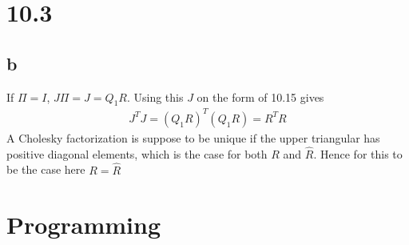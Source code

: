 \documentclass[11pt]{article} %
\begin{document}
\section*{10.3}
\subsection*{\textbf{b}}
If $\Pi = I$, $J \Pi = J = Q_1 R$. Using this $J$ on the form of 10.15 gives
\begin{gather*}J^T J = (Q_ 1 R)^T (Q_1 R) = R^T R\end{gather*}A Cholesky factorization is suppose to be unique if the upper triangular has positive diagonal elements, which is the case for both $R$ and $\hat{R}$. Hence for this to be the case here $R = \hat{R}$
\section*{Programming}


\end{document}
